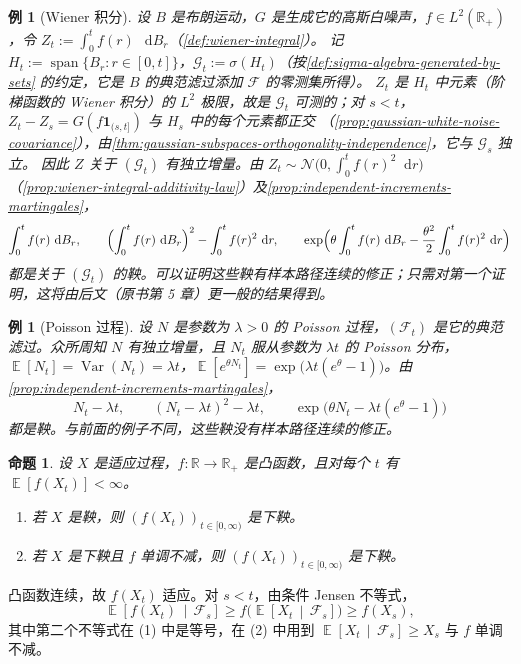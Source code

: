 \documentclass[UTF8,11pt,a4paper,oneside,fontset=fandol]{ctexrep}
\makeatletter
\numberwithin{equation}{section}
\theoremstyle{zhthm}
\newtheorem{proposition}[theorem]{命题}
\newtheorem{example}[theorem]{例}
\renewenvironment{proof}[1][\proofname]{\par
  \pushQED{\qed}%
  \normalfont\topsep6\p@\@plus6\p@\relax
  \trivlist
  \item[\hskip\labelsep\bfseries#1\hspace{0.5em}]\ignorespaces
}{%
  \popQED\endtrivlist\@endpefalse
}
\renewcommand{\proofname}{证明}
\newcommand{\R}{\mathbb{R}}
\newcommand{\F}{\mathcal{F}}
\newcommand{\G}{\mathcal{G}}
\DeclareMathOperator{\E}{\mathbb{E}}
\DeclareMathOperator{\Var}{Var}
\DeclareMathOperator{\Span}{span}
\newcommand{\Normal}{\mathcal{N}}
\newcommand{\ind}[1]{\mathbf{1}_{#1}}
\newcommand{\dd}{\mathop{}\!\mathrm{d}}
\newcommand{\Econd}[2]{%
  \E\!\left[#1\,\middle|\,#2\right]}
\makeatother
\begin{document}
\begin{example}[Wiener 积分]
\label{ex:wiener-integral-martingales}
设 $B$ 是布朗运动，$G$ 是生成它的高斯白噪声，$f\in L^2(\R_+)$，令 $Z_t:=\int_0^tf(r)\,\dd B_r$（\cref{def:wiener-integral}）。
记 $H_t:=\Span\{B_r:r\in[0,t]\}$，$\G_t:=\sigma(H_t)$（按\cref{def:sigma-algebra-generated-by-sets} 的约定，它是 $B$ 的典范滤过添加 $\F$ 的零测集所得）。
$Z_t$ 是 $H_t$ 中元素（阶梯函数的 Wiener 积分）的 $L^2$ 极限，故是 $\G_t$ 可测的；对 $s<t$，$Z_t-Z_s=G(f\ind{(s,t]})$ 与 $H_s$ 中的每个元素都正交
（\cref{prop:gaussian-white-noise-covariance}），由\cref{thm:gaussian-subspaces-orthogonality-independence}，它与 $\G_s$ 独立。
因此 $Z$ 关于 $(\G_t)$ 有独立增量。由 $Z_t\sim\Normal\bigl(0,\int_0^tf(r)^2\dd r\bigr)$（\cref{prop:wiener-integral-additivity-law}）及\cref{prop:independent-increments-martingales}，
\[
  \int_0^tf(r)\,\dd B_r,\qquad \Bigl(\int_0^tf(r)\,\dd B_r\Bigr)^2-\int_0^tf(r)^2\,\dd r,\qquad
  \exp\Bigl(\theta\int_0^tf(r)\,\dd B_r-\frac{\theta^2}{2}\int_0^tf(r)^2\,\dd r\Bigr)
\]
都是关于 $(\G_t)$ 的鞅。可以证明这些鞅有样本路径连续的修正；只需对第一个证明，这将由后文（原书第 5 章）更一般的结果得到。
\end{example}

\begin{example}[Poisson 过程]
\label{ex:poisson-martingales}
设 $N$ 是参数为 $\lambda>0$ 的 Poisson 过程，$(\F_t)$ 是它的典范滤过。众所周知 $N$ 有独立增量，且 $N_t$ 服从参数为 $\lambda t$ 的 Poisson 分布，
$\E[N_t]=\Var(N_t)=\lambda t$，$\E[e^{\theta N_t}]=\exp\bigl(\lambda t(e^\theta-1)\bigr)$。由\cref{prop:independent-increments-martingales}，
\[
  N_t-\lambda t,\qquad (N_t-\lambda t)^2-\lambda t,\qquad \exp\bigl(\theta N_t-\lambda t(e^\theta-1)\bigr)
\]
都是鞅。与前面的例子不同，这些鞅没有样本路径连续的修正。
\end{example}

\begin{proposition}
\label{prop:convex-function-submartingale}
设 $X$ 是适应过程，$f:\R\to\R_+$ 是凸函数，且对每个 $t$ 有 $\E[f(X_t)]<\infty$。
\begin{enumerate}[label=(\arabic*)]
  \item 若 $X$ 是鞅，则 $(f(X_t))_{t\in[0,\infty)}$ 是下鞅。
  \item 若 $X$ 是下鞅且 $f$ 单调不减，则 $(f(X_t))_{t\in[0,\infty)}$ 是下鞅。
\end{enumerate}
\end{proposition}

\begin{proof}
凸函数连续，故 $f(X_t)$ 适应。对 $s<t$，由条件 Jensen 不等式\cite[定理 4.1.10]{Durrett2019}，
\[
  \Econd{f(X_t)}{\F_s}\ge f\bigl(\Econd{X_t}{\F_s}\bigr)\ge f(X_s),
\]
其中第二个不等式在 (1) 中是等号，在 (2) 中用到 $\Econd{X_t}{\F_s}\ge X_s$ 与 $f$ 单调不减。
\end{proof}
\end{document}
